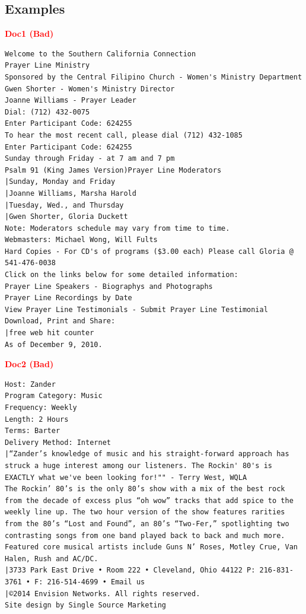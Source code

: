 \documentclass{article}
\begin{document}
\subsection{Examples}

\textcolor{red}{\textbf{Doc1 (Bad)}}
\begin{scriptsize}
\begin{Verbatim}[frame=single, framesep=3mm, breaklines=true]
Welcome to the Southern California Connection
Prayer Line Ministry
Sponsored by the Central Filipino Church - Women's Ministry Department
Gwen Shorter - Women's Ministry Director
Joanne Williams - Prayer Leader
Dial: (712) 432-0075
Enter Participant Code: 624255
To hear the most recent call, please dial (712) 432-1085
Enter Participant Code: 624255
Sunday through Friday - at 7 am and 7 pm
Psalm 91 (King James Version)Prayer Line Moderators
|Sunday, Monday and Friday
|Joanne Williams, Marsha Harold
|Tuesday, Wed., and Thursday
|Gwen Shorter, Gloria Duckett
Note: Moderators schedule may vary from time to time.
Webmasters: Michael Wong, Will Fults
Hard Copies - For CD's of programs ($3.00 each) Please call Gloria @ 541-476-0038
Click on the links below for some detailed information:
Prayer Line Speakers - Biographys and Photographs
Prayer Line Recordings by Date
View Prayer Line Testimonials - Submit Prayer Line Testimonial
Download, Print and Share:
|free web hit counter
As of December 9, 2010.
\end{Verbatim}
\end{scriptsize}

\textcolor{red}{\textbf{Doc2 (Bad)}}
\begin{scriptsize}
\begin{Verbatim}[frame=single, framesep=3mm, breaklines=true]
Host: Zander
Program Category: Music
Frequency: Weekly
Length: 2 Hours
Terms: Barter
Delivery Method: Internet
|“Zander’s knowledge of music and his straight-forward approach has struck a huge interest among our listeners. The Rockin' 80's is EXACTLY what we've been looking for!"" - Terry West, WQLA
The Rockin’ 80’s is the only 80’s show with a mix of the best rock from the decade of excess plus “oh wow” tracks that add spice to the weekly line up. The two hour version of the show features rarities from the 80’s “Lost and Found”, an 80’s “Two-Fer,” spotlighting two contrasting songs from one band played back to back and much more. Featured core musical artists include Guns N’ Roses, Motley Crue, Van Halen, Rush and AC/DC.
|3733 Park East Drive • Room 222 • Cleveland, Ohio 44122 P: 216-831-3761 • F: 216-514-4699 • Email us
|©2014 Envision Networks. All rights reserved.
Site design by Single Source Marketing
\end{Verbatim}
\end{scriptsize}
\end{document}
